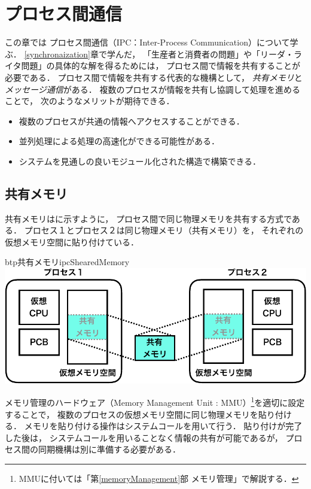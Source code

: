 \chapter{プロセス間通信}
\label{interProcessCommunication}
この章では
プロセス間通信（IPC：Inter-Process Communication）について学ぶ．
\ref{synchronaization}章で学んだ，
「生産者と消費者の問題」や「リーダ・ライタ問題」の具体的な解を得るためには，
プロセス間で情報を共有することが必要である．
プロセス間で情報を共有する代表的な機構として，
\emph{共有メモリ}と\emph{メッセージ通信}がある．
複数のプロセスが情報を共有し協調して処理を進めることで，
次のようなメリットが期待できる．

\begin{itemize}
\item 複数のプロセスが共通の情報へアクセスすることができる．
\item 並列処理による処理の高速化ができる可能性がある．
\item システムを見通しの良いモジュール化された構造で構築できる．
\end{itemize}

\section{共有メモリ}
共有メモリはに示すように，
プロセス間で同じ物理メモリを共有する方式である．
プロセス１とプロセス２は同じ物理メモリ（共有メモリ）を，
それぞれの仮想メモリ空間に貼り付けている．

\begin{myfig}{btp}{共有メモリ}{ipcShearedMemory}
  \includegraphics[scale=0.6]{Fig/ipcShearedMemory-crop.pdf}
\end{myfig}

メモリ管理のハードウェア（Memory Management Unit : MMU）\footnote{
  MMUに付いては「第\ref{memoryManagement}部 メモリ管理」で解説する．
}を適切に設定することで，
複数のプロセスの仮想メモリ空間に同じ物理メモリを貼り付ける．
メモリを貼り付ける操作はシステムコールを用いて行う．
貼り付けが完了した後は，
システムコールを用いることなく情報の共有が可能であるが，
プロセス間の同期機構は別に準備する必要がある．

